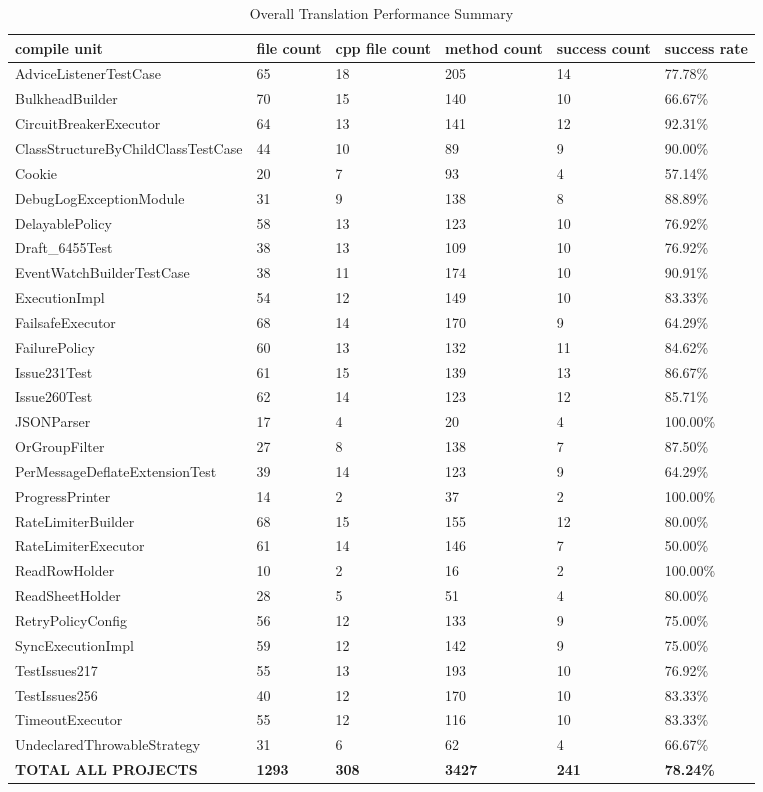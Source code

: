 \begin{table}[htbp]
\centering
\caption{Overall Translation Performance Summary}
\label{tab:overall-results-rq1}
\begin{tabular}{llllll}
\toprule
\textbf{compile unit} & \textbf{file count} & \textbf{cpp file count} & \textbf{method count} & \textbf{success count} & \textbf{success rate} \\
\midrule
AdviceListenerTestCase & 65 & 18 & 205 & 14 & 77.78\% \\
BulkheadBuilder & 70 & 15 & 140 & 10 & 66.67\% \\
CircuitBreakerExecutor & 64 & 13 & 141 & 12 & 92.31\% \\
ClassStructureByChildClassTestCase & 44 & 10 & 89 & 9 & 90.00\% \\
Cookie & 20 & 7 & 93 & 4 & 57.14\% \\
DebugLogExceptionModule & 31 & 9 & 138 & 8 & 88.89\% \\
DelayablePolicy & 58 & 13 & 123 & 10 & 76.92\% \\
Draft\_6455Test & 38 & 13 & 109 & 10 & 76.92\% \\
EventWatchBuilderTestCase & 38 & 11 & 174 & 10 & 90.91\% \\
ExecutionImpl & 54 & 12 & 149 & 10 & 83.33\% \\
FailsafeExecutor & 68 & 14 & 170 & 9 & 64.29\% \\
FailurePolicy & 60 & 13 & 132 & 11 & 84.62\% \\
Issue231Test & 61 & 15 & 139 & 13 & 86.67\% \\
Issue260Test & 62 & 14 & 123 & 12 & 85.71\% \\
JSONParser & 17 & 4 & 20 & 4 & 100.00\% \\
OrGroupFilter & 27 & 8 & 138 & 7 & 87.50\% \\
PerMessageDeflateExtensionTest & 39 & 14 & 123 & 9 & 64.29\% \\
ProgressPrinter & 14 & 2 & 37 & 2 & 100.00\% \\
RateLimiterBuilder & 68 & 15 & 155 & 12 & 80.00\% \\
RateLimiterExecutor & 61 & 14 & 146 & 7 & 50.00\% \\
ReadRowHolder & 10 & 2 & 16 & 2 & 100.00\% \\
ReadSheetHolder & 28 & 5 & 51 & 4 & 80.00\% \\
RetryPolicyConfig & 56 & 12 & 133 & 9 & 75.00\% \\
SyncExecutionImpl & 59 & 12 & 142 & 9 & 75.00\% \\
TestIssues217 & 55 & 13 & 193 & 10 & 76.92\% \\
TestIssues256 & 40 & 12 & 170 & 10 & 83.33\% \\
TimeoutExecutor & 55 & 12 & 116 & 10 & 83.33\% \\
UndeclaredThrowableStrategy & 31 & 6 & 62 & 4 & 66.67\% \\
\midrule
\textbf{TOTAL ALL PROJECTS} & \textbf{1293} & \textbf{308} & \textbf{3427} & \textbf{241} & \textbf{78.24\%} \\
\bottomrule
\end{tabular}
\end{table}